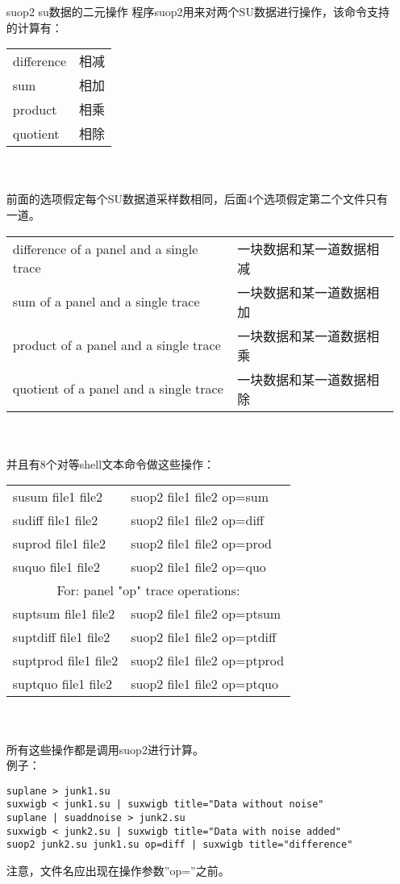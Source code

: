 \begin{enumerate}
	\item[suop2] su数据的二元操作
	程序suop2用来对两个SU数据进行操作，该命令支持的计算有：\par
	\begin{tabular}{p{}l}
		\toprule
		difference &  相减\\
		sum & 相加\\	
		product & 相乘\\	
		quotient & 相除\\
		\bottomrule
	\end{tabular}\\\\
	前面的选项假定每个SU数据道采样数相同，后面4个选项假定第二个文件只有一道。\par
	\begin{tabular}{p{}l}
		\toprule
		difference of a panel and a single trace & 一块数据和某一道数据相减\\
		sum of a panel and a single trace & 一块数据和某一道数据相加\\
		product of a panel and a single trace & 一块数据和某一道数据相乘\\
		quotient of a panel and a single trace & 一块数据和某一道数据相除\\
		\bottomrule
	\end{tabular}\\\\
	并且有8个对等shell文本命令做这些操作：\\
	\begin{tabular}{ll}
		\toprule
		susum file1 file2 & suop2 file1 file2 op=sum\\
		sudiff file1 file2 & suop2 file1 file2 op=diff\\	
		suprod file1 file2 & suop2 file1 file2 op=prod\\	
		suquo file1 file2 & suop2 file1 file2 op=quo\\
		\bottomrule
		\multicolumn{2}{c}{For: panel "op" trace operations:}\\
		\toprule
		suptsum file1 file2 & suop2 file1 file2 op=ptsum\\
		suptdiff file1 file2 & suop2 file1 file2 op=ptdiff\\	
		suptprod file1 file2 & suop2 file1 file2 op=ptprod	\\
		suptquo file1 file2 & suop2 file1 file2 op=ptquo\\
		\bottomrule
	\end{tabular}\\\\
	所有这些操作都是调用suop2进行计算。\\
	例子：
\begin{lstlisting}
suplane > junk1.su
suxwigb < junk1.su | suxwigb title="Data without noise" 	
suplane | suaddnoise > junk2.su	
suxwigb < junk2.su | suxwigb title="Data with noise added" 	
suop2 junk2.su junk1.su op=diff | suxwigb title="difference" 
\end{lstlisting}
	注意，文件名应出现在操作参数”op=”之前。
\end{enumerate}
